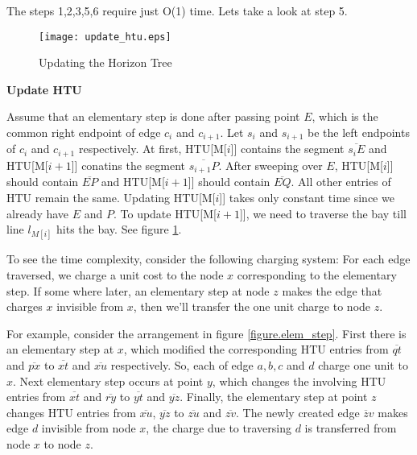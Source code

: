 \documentclass[12pt]{article}
\begin{document}
The steps 1,2,3,5,6 require just O(1) time. Lets take a look at step 5.


\begin{figure}
\center
\texttt{[image: update\_htu.eps]}
\caption{Updating the Horizon Tree}
\label{figure.update_htu}
\end{figure}

\vspace{.2 cm}

{\bf Update HTU}

\vspace{.2 cm}

Assume that an elementary step is done after passing point $E$, which
is the common right endpoint of edge $c_{i}$ and $c_{i+1}$. Let
$s_{i}$ and $s_{i+1}$ be the left endpoints of $c_{i}$ and $c_{i+1}$
respectively. At first, HTU[M[$i$]] contains the segment ${\overline{ 
s_{i}E}}$ and HTU[M[$i+1$]] conatins the segment
${\overline{s_{i+1}P}}$.
After sweeping over $E$, HTU[M[$i$]] should contain ${\overline{EP}}$
and HTU[M[$i+1$]] should contain ${\overline{EQ}}$. All other entries
of HTU remain the same.  Updating HTU[M[$i$]] takes only constant time
since we already have $E$ and $P$. To update HTU[M[$i+1$]], we need to
traverse the bay till line $l_{M[i]}$ hits the bay.  See figure \ref{figure.update_htu}.

To see the time complexity, consider the following charging system:
For each edge traversed, we charge a unit cost to the node $x$
corresponding to the elementary step. If some where later, an
elementary step at node $z$ makes the edge that charges $x$ invisible
from $x$, then we'll transfer the one unit charge to node $z$.

\newpage

For example, consider the arrangement in figure \ref{figure.elem_step}. First there
is an elementary step at $x$, which modified the corresponding HTU
entries from ${\overline{qt}}$ and ${\overline{px}}$ to ${\overline{xt}}$
and ${\overline{xu}}$ respectively. So, each of edge $a,b,c$ and $d$
charge one unit to $x$. Next elementary step occurs at point $y$,
which changes the involving HTU entries from ${\overline{xt}}$ and
${\overline{ry}}$ to ${\overline{yt}}$ and ${\overline{yz}}$.  Finally,
the elementary step at point $z$ changes HTU entries from ${\overline{
xu}}$, ${\overline{yz}}$ to ${\overline{zu}}$ and ${\overline{zv}}$. The
newly created edge ${\overline zv}$ makes edge $d$ invisible from node
$x$, the charge due to traversing $d$ is transferred from node $x$ to
node $z$.  %
\end{document}
